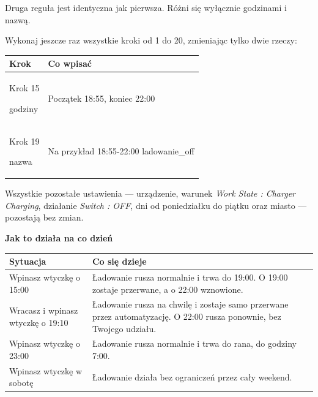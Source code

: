 \documentclass[11pt]{article}
\begin{document}
\clearpage


Druga reguła jest identyczna jak pierwsza. Różni się wyłącznie godzinami i nazwą.

\vspace{0.2cm}
Wykonaj jeszcze raz wszystkie kroki od 1 do 20, zmieniając tylko dwie rzeczy:

\vspace{0.3cm}
\begin{tabularx}{\textwidth}{@{}p{3.2cm}X@{}}
\toprule
\textbf{\color{apnavy}Krok} & \textbf{\color{apnavy}Co wpisać}\\
\midrule
Krok 15 \par {\footnotesize godziny} & Początek 18:55, koniec 22:00\\
Krok 19 \par {\footnotesize nazwa} & Na przykład 18:55-22:00 ladowanie\_off\\
\bottomrule
\end{tabularx}

\vspace{0.2cm}
Wszystkie pozostałe ustawienia — urządzenie, warunek \emph{Work State : Charger Charging}, działanie \emph{Switch : OFF}, dni od poniedziałku do piątku oraz miasto — pozostają bez zmian.


\vspace{0.5cm}
{\bfseries\color{apnavy}\large Jak to działa na co dzień}

\vspace{0.2cm}
\begin{tabularx}{\textwidth}{@{}p{4.4cm}X@{}}
\toprule
\textbf{\color{apnavy}Sytuacja} & \textbf{\color{apnavy}Co się dzieje}\\
\midrule
Wpinasz wtyczkę o 15:00 & Ładowanie rusza normalnie i trwa do 19:00. O 19:00 zostaje przerwane, a o 22:00 wznowione.\\
Wracasz i wpinasz wtyczkę o 19:10 & Ładowanie rusza na chwilę i zostaje samo przerwane przez automatyzację. O 22:00 rusza ponownie, bez Twojego udziału.\\
Wpinasz wtyczkę o 23:00 & Ładowanie rusza normalnie i trwa do rana, do godziny 7:00.\\
Wpinasz wtyczkę w sobotę & Ładowanie działa bez ograniczeń przez cały weekend.\\
\bottomrule
\end{tabularx}
\end{document}
